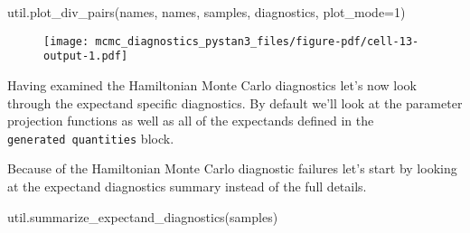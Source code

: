 \documentclass[
  letterpaper,
  DIV=11,
  numbers=noendperiod]{scrartcl}
\newenvironment{Shaded}{\begin{snugshade}}{\end{snugshade}}
\newcommand{\DecValTok}[1]{\textcolor[rgb]{0.68,0.00,0.00}{#1}}
\newcommand{\NormalTok}[1]{\textcolor[rgb]{0.00,0.23,0.31}{#1}}
\newcommand{\OperatorTok}[1]{\textcolor[rgb]{0.37,0.37,0.37}{#1}}
\begin{document}
\begin{Shaded}
\begin{Highlighting}[]
\NormalTok{util.plot\_div\_pairs(names, names, samples, diagnostics, plot\_mode}\OperatorTok{=}\DecValTok{1}\NormalTok{)}
\end{Highlighting}
\end{Shaded}

\begin{figure}[H]

{\centering \texttt{[image: mcmc\_diagnostics\_pystan3\_files/figure-pdf/cell-13-output-1.pdf]}

}

\end{figure}

Having examined the Hamiltonian Monte Carlo diagnostics let's now look
through the expectand specific diagnostics. By default we'll look at the
parameter projection functions as well as all of the expectands defined
in the \texttt{generated\ quantities} block.

Because of the Hamiltonian Monte Carlo diagnostic failures let's start
by looking at the expectand diagnostics summary instead of the full
details.

\begin{Shaded}
\begin{Highlighting}[]
\NormalTok{util.summarize\_expectand\_diagnostics(samples)}
\end{Highlighting}
\end{Shaded}
\end{document}
